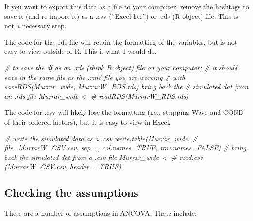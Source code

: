 \documentclass[
  11pt,
]{book}
\newenvironment{Shaded}{\begin{snugshade}}{\end{snugshade}}
\newcommand{\CommentTok}[1]{\textcolor[rgb]{0.56,0.35,0.01}{\textit{#1}}}
\begin{document}
If you want to export this data as a file to your computer, remove the hashtags to save it (and re-import it) as a .csv (``Excel lite'') or .rds (R object) file. This is not a necessary step.

The code for the .rds file will retain the formatting of the variables, but is not easy to view outside of R. This is what I would do.

\begin{Shaded}
\begin{Highlighting}[]
\CommentTok{\# to save the df as an .rds (think \textquotesingle{}R object\textquotesingle{}) file on your computer;}
\CommentTok{\# it should save in the same file as the .rmd file you are working}
\CommentTok{\# with saveRDS(Murrar\_wide, \textquotesingle{}MurrarW\_RDS.rds\textquotesingle{}) bring back the}
\CommentTok{\# simulated dat from an .rds file Murrar\_wide \textless{}{-}}
\CommentTok{\# readRDS(\textquotesingle{}MurrarW\_RDS.rds\textquotesingle{})}
\end{Highlighting}
\end{Shaded}

The code for .csv will likely lose the formatting (i.e., stripping Wave and COND of their ordered factors), but it is easy to view in Excel.

\begin{Shaded}
\begin{Highlighting}[]
\CommentTok{\# write the simulated data as a .csv write.table(Murrar\_wide,}
\CommentTok{\# file=\textquotesingle{}MurrarW\_CSV.csv\textquotesingle{}, sep=\textquotesingle{},\textquotesingle{}, col.names=TRUE, row.names=FALSE)}
\CommentTok{\# bring back the simulated dat from a .csv file Murrar\_wide \textless{}{-}}
\CommentTok{\# read.csv (\textquotesingle{}MurrarW\_CSV.csv\textquotesingle{}, header = TRUE)}
\end{Highlighting}
\end{Shaded}

\hypertarget{checking-the-assumptions}{%
\subsection{Checking the assumptions}\label{checking-the-assumptions}}

There are a number of assumptions in ANCOVA. These include:
\end{document}
